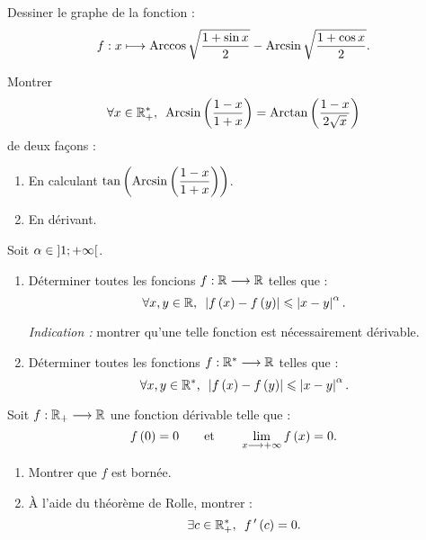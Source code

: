 \begin{corr}
\end{corr}

\begin{exo}
Dessiner le graphe de la fonction : \[f:x\longmapsto\operatorname{Arccos}\sqrt{\dfrac{1+\sin x}{2}}-\operatorname{Arcsin}\sqrt{\dfrac{1+\cos x}{2}}.\]
\end{exo}

\begin{corr}
\end{corr}

\begin{exo}
Montrer \[\quantifs{\forall x\in\Rps}\Arcsin\paren{\dfrac{1-x}{1+x}}=\Arctan\paren{\dfrac{1-x}{2\sqrt{x}}}\] de deux façons :

\begin{enumerate}
\item En calculant \(\tan\left(\operatorname{Arcsin}\left(\dfrac{1-x}{1+x}\right)\right)\). \\

\item En dérivant.
\end{enumerate}
\end{exo}

\begin{corr}
\end{corr}

\begin{exo}
Soit \(\alpha\in\left]1;+\infty\right[\).

\begin{enumerate}
\item Déterminer toutes les foncions \(f:\mathbb{R}\longrightarrow\mathbb{R}\) telles que : \[\quantifs{\forall x,y\in\R}\abs{f\paren{x}-f\paren{y}}\leq\abs{x-y}^{\alpha}.\]

\textit{Indication :} montrer qu'une telle fonction est nécessairement dérivable. \\

\item Déterminer toutes les fonctions \(f:\mathbb{R}^*\longrightarrow\mathbb{R}\) telles que : \[\quantifs{\forall x,y\in\Rs}\abs{f\paren{x}-f\paren{y}}\leq\abs{x-y}^{\alpha}.\]
\end{enumerate}
\end{exo}

\begin{corr}
\end{corr}

\begin{exo}
Soit \(f:\mathbb{R}_+\longrightarrow\mathbb{R}\) une fonction dérivable telle que : \[f\left(0\right)=0\qquad\text{et}\qquad\lim_{x\longrightarrow+\infty}f\left(x\right)=0.\]

\begin{enumerate}
\item Montrer que \(f\) est bornée. \\

\item À l'aide du théorème de Rolle, montrer : \[\quantifs{\exists c\in\Rps}f\prim\paren{c}=0.\]
\end{enumerate}
\end{exo}

